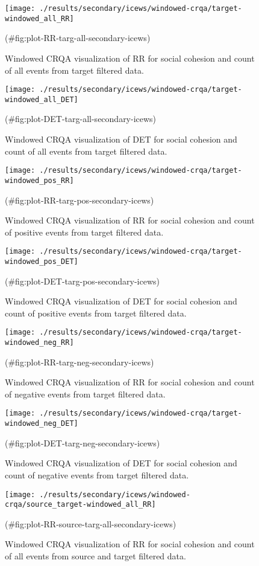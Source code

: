\begin{appendix}
\begin{figure}[H]
\texttt{[image: ./results/secondary/icews/windowed-crqa/target-windowed\_all\_RR]} \caption{Windowed CRQA visualization of RR for social cohesion and count of all events from target filtered data.}(\#fig:plot-RR-targ-all-secondary-icews)
\end{figure}
\begin{figure}[H]
\texttt{[image: ./results/secondary/icews/windowed-crqa/target-windowed\_all\_DET]} \caption{Windowed CRQA visualization of DET for social cohesion and count of all events from target filtered data.}(\#fig:plot-DET-targ-all-secondary-icews)
\end{figure}
\begin{figure}[H]
\texttt{[image: ./results/secondary/icews/windowed-crqa/target-windowed\_pos\_RR]} \caption{Windowed CRQA visualization of RR for social cohesion and count of positive events from target filtered data.}(\#fig:plot-RR-targ-pos-secondary-icews)
\end{figure}
\begin{figure}[H]
\texttt{[image: ./results/secondary/icews/windowed-crqa/target-windowed\_pos\_DET]} \caption{Windowed CRQA visualization of DET for social cohesion and count of positive events from target filtered data.}(\#fig:plot-DET-targ-pos-secondary-icews)
\end{figure}
\begin{figure}[H]
\texttt{[image: ./results/secondary/icews/windowed-crqa/target-windowed\_neg\_RR]} \caption{Windowed CRQA visualization of RR for social cohesion and count of negative events from target filtered data.}(\#fig:plot-RR-targ-neg-secondary-icews)
\end{figure}
\begin{figure}[H]
\texttt{[image: ./results/secondary/icews/windowed-crqa/target-windowed\_neg\_DET]} \caption{Windowed CRQA visualization of DET for social cohesion and count of negative events from target filtered data.}(\#fig:plot-DET-targ-neg-secondary-icews)
\end{figure}
\begin{figure}[H]
\texttt{[image: ./results/secondary/icews/windowed-crqa/source\_target-windowed\_all\_RR]} \caption{Windowed CRQA visualization of RR for social cohesion and count of all events from source and target filtered data.}(\#fig:plot-RR-source-targ-all-secondary-icews)
\end{figure}

\end{appendix}
